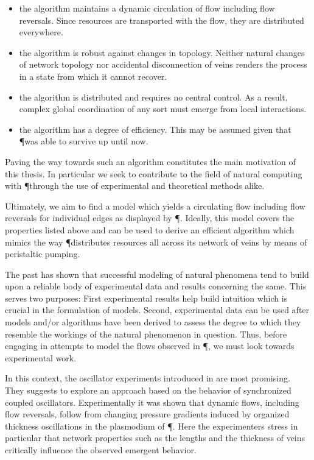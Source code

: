 	\begin{itemize}
		\item the algorithm maintains a dynamic circulation of flow including flow reversals. Since resources are transported with the flow, they are distributed everywhere.
		\item the algorithm is robust against changes in topology. Neither natural changes of network topology nor accidental disconnection of veins renders the process in a state from which it cannot recover.
		\item the algorithm is distributed and requires no central control. As a result, complex global coordination of any sort must emerge from local interactions.
		\item the algorithm has a degree of efficiency. This may be assumed given that \P was able to survive up until now.
	\end{itemize}

	Paving the way towards such an algorithm constitutes the main motivation of this thesis. In particular we seek to contribute to the field of natural computing with \P through the use of experimental and theoretical methods alike.

	Ultimately, we aim to find a model which yields a circulating flow including flow reversals for individual edges as displayed by \P. Ideally, this model covers the properties listed above and can be used to derive an efficient algorithm which mimics the way \P distributes resources all across its network of veins by means of peristaltic pumping. 

	The past has shown that successful modeling of natural phenomena tend to build upon a reliable body of experimental data and results concerning the same. This serves two purposes: First experimental results help build intuition which is crucial in the formulation of models. Second, experimental data can be used after models and/or algorithms have been derived to assess the degree to which they resemble the workings of the natural phenomenon in question. Thus, before engaging in attempts to model the flows observed in \P, we must look towards experimental work.

	In this context, the oscillator experiments introduced in  are most promising. They suggests to explore an approach based on the behavior of synchronized coupled oscillators. Experimentally it was shown that dynamic flows, including flow reversals, follow from changing pressure gradients induced by organized thickness oscillations in the plasmodium of \P. Here the experimenters stress in particular that network properties such as the lengths and the thickness of veins critically influence the observed emergent behavior. 

